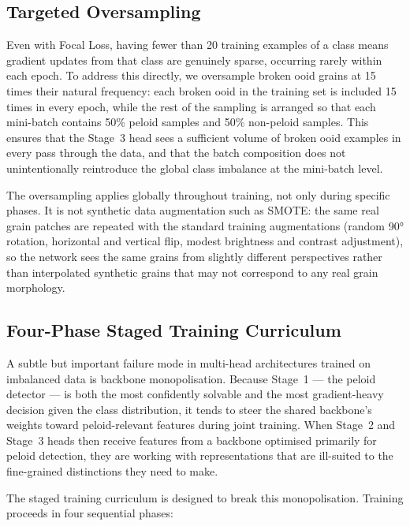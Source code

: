 \documentclass[a4paper,fleqn]{cas-dc}
\begin{document}
\subsection{Targeted Oversampling}
\label{sec:oversampling}
Even with Focal Loss, having fewer than 20 training examples of a class means gradient updates from that class are genuinely sparse, occurring rarely within each epoch. To address this directly, we oversample broken ooid grains at 15 times their natural frequency: each broken ooid in the training set is included 15 times in every epoch, while the rest of the sampling is arranged so that each mini-batch contains 50\% peloid samples and 50\% non-peloid samples. This ensures that the Stage~3 head sees a sufficient volume of broken ooid examples in every pass through the data, and that the batch composition does not unintentionally reintroduce the global class imbalance at the mini-batch level.

The oversampling applies globally throughout training, not only during specific phases. It is not synthetic data augmentation such as SMOTE: the same real grain patches are repeated with the standard training augmentations (random 90° rotation, horizontal and vertical flip, modest brightness and contrast adjustment), so the network sees the same grains from slightly different perspectives rather than interpolated synthetic grains that may not correspond to any real grain morphology.

\subsection{Four-Phase Staged Training Curriculum}
\label{sec:staged_training}
A subtle but important failure mode in multi-head architectures trained on imbalanced data is backbone monopolisation. Because Stage~1 --- the peloid detector --- is both the most confidently solvable and the most gradient-heavy decision given the class distribution, it tends to steer the shared backbone's weights toward peloid-relevant features during joint training. When Stage~2 and Stage~3 heads then receive features from a backbone optimised primarily for peloid detection, they are working with representations that are ill-suited to the fine-grained distinctions they need to make.

The staged training curriculum is designed to break this monopolisation. Training proceeds in four sequential phases:
\end{document}
